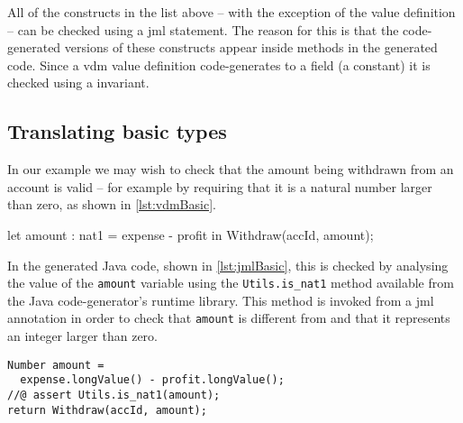All of the constructs in the list above -- with the exception of the
value definition -- can be checked using a \ac{jml} 
statement. The reason for this is that the code-generated versions of
these constructs appear inside methods in the generated code. Since a
\ac{vdm} value definition code-generates to a  
 field (a constant) it is checked using a 
invariant.

\subsection{Translating basic types}
\label{sec:basic}

In our example we may wish to check that the amount being withdrawn
from an account is valid -- for example by requiring that it is a
natural number larger than zero, as shown in \autoref{lst:vdmBasic}.

\begin{vdmsl}[style=customVdm,caption={Use of explicit type annotation
to ensure that a valid amount is being
withdrawn.},label={lst:vdmBasic}]
let amount : nat1 = expense - profit
in
  Withdraw(accId, amount);
\end{vdmsl}

In the generated Java code, shown in \autoref{lst:jmlBasic}, this is
checked by analysing the value of the \texttt{amount} variable using
the \texttt{Utils.is\_nat1} method available from the Java
code-generator's runtime library. This method is invoked from a
\ac{jml} annotation in order to check that \texttt{amount} is
different from  and that it represents an integer larger than
zero.

\begin{lstlisting}[style=customJml,caption={Use of \ac{jml} to check
that a valid amount is being withdrawn.},label={lst:jmlBasic}]
Number amount =
  expense.longValue() - profit.longValue();
//@ assert Utils.is_nat1(amount);
return Withdraw(accId, amount);
\end{lstlisting}


